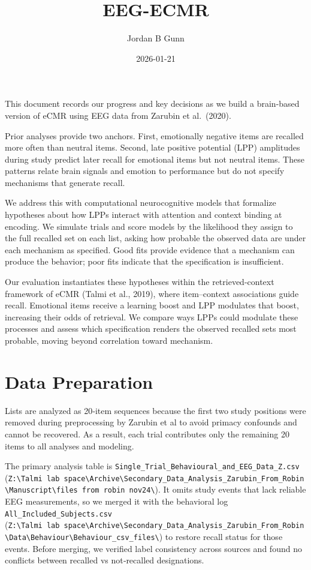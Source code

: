 \documentclass[
  letterpaper,
  DIV=11,
  numbers=noendperiod]{scrartcl}
\title{EEG-ECMR}
\author{Jordan B Gunn}
\date{2026-01-21}
\begin{document}
\maketitle


This document records our progress and key decisions as we build a
brain-based version of eCMR using EEG data from Zarubin et al.~(2020).

Prior analyses provide two anchors. First, emotionally negative items
are recalled more often than neutral items. Second, late positive
potential (LPP) amplitudes during study predict later recall for
emotional items but not neutral items. These patterns relate brain
signals and emotion to performance but do not specify mechanisms that
generate recall.

We address this with computational neurocognitive models that formalize
hypotheses about how LPPs interact with attention and context binding at
encoding. We simulate trials and score models by the likelihood they
assign to the full recalled set on each list, asking how probable the
observed data are under each mechanism as specified. Good fits provide
evidence that a mechanism can produce the behavior; poor fits indicate
that the specification is insufficient.

Our evaluation instantiates these hypotheses within the
retrieved-context framework of eCMR (Talmi et al., 2019), where
item--context associations guide recall. Emotional items receive a
learning boost and LPP modulates that boost, increasing their odds of
retrieval. We compare ways LPPs could modulate these processes and
assess which specification renders the observed recalled sets most
probable, moving beyond correlation toward mechanism.

\section{Data Preparation}\label{data-preparation}

Lists are analyzed as 20‑item sequences because the first two study
positions were removed during preprocessing by Zarubin et al to avoid
primacy confounds and cannot be recovered. As a result, each trial
contributes only the remaining 20 items to all analyses and modeling.

The primary analysis table is
\texttt{Single\_Trial\_Behavioural\_and\_EEG\_Data\_Z.csv}
(\texttt{Z:\textbackslash{}Talmi\ lab\ space\textbackslash{}Archive\textbackslash{}Secondary\_Data\_Analysis\_Zarubin\_From\_Robin\textbackslash{}Manuscript\textbackslash{}files\ from\ robin\ nov24\textbackslash{}}).
It omits study events that lack reliable EEG measurements, so we merged
it with the behavioral log \texttt{All\_Included\_Subjects.csv}
(\texttt{Z:\textbackslash{}Talmi\ lab\ space\textbackslash{}Archive\textbackslash{}Secondary\_Data\_Analysis\_Zarubin\_From\_Robin\textbackslash{}Data\textbackslash{}Behaviour\textbackslash{}Behaviour\_csv\_files\textbackslash{}})
to restore recall status for those events. Before merging, we verified
label consistency across sources and found no conflicts between recalled
vs not‑recalled designations.
\end{document}
